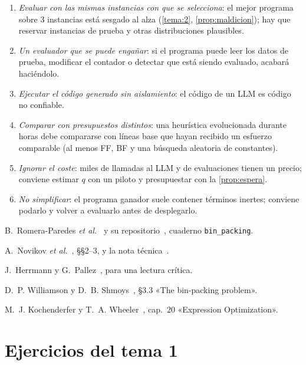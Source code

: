 \begin{observacion}\label{obs:errores1}
\begin{enumerate}[label=(\alph*)]
  \item \emph{Evaluar con las mismas instancias con que se selecciona}: el mejor programa sobre 3 instancias está sesgado al alza (\cref{tema:2}, \cref{prop:maldicion}); hay que reservar instancias de prueba y otras distribuciones plausibles.
  \item \emph{Un evaluador que se puede engañar}: si el programa puede leer los datos de prueba, modificar el contador o detectar que está siendo evaluado, acabará haciéndolo.
  \item \emph{Ejecutar el código generado sin aislamiento}: el código de un LLM es código no confiable.
  \item \emph{Comparar con presupuestos distintos}: una heurística evolucionada durante horas debe compararse con líneas base que hayan recibido un esfuerzo comparable (al menos FF, BF y una búsqueda aleatoria de constantes).
  \item \emph{Ignorar el coste}: miles de llamadas al LLM y de evaluaciones tienen un precio; conviene estimar $q$ con un piloto y presupuestar con la \cref{prop:espera}.
  \item \emph{No simplificar}: el programa ganador suele contener términos inertes; conviene podarlo y volver a evaluarlo antes de desplegarlo.
\end{enumerate}
\end{observacion}

\begin{lecturas}
\item B.~Romera-Paredes \emph{et al.}~\cite{funsearch} y su repositorio~\cite{funsearch-code}, cuaderno \texttt{bin\_packing}.
\item A.~Novikov \emph{et al.}~\cite{alphaevolve}, §§2--3, y la nota técnica~\cite{ae-blog}.
\item J.~Herrmann y G.~Pallez~\cite{hp}, para una lectura crítica.
\item D.~P. Williamson y D.~B. Shmoys~\cite{ws}, §3.3 «The bin-packing problem».
\item M.~J. Kochenderfer y T.~A. Wheeler~\cite{kw}, cap.~20 «Expression Optimization».
\end{lecturas}

\section*{Ejercicios del tema 1}

